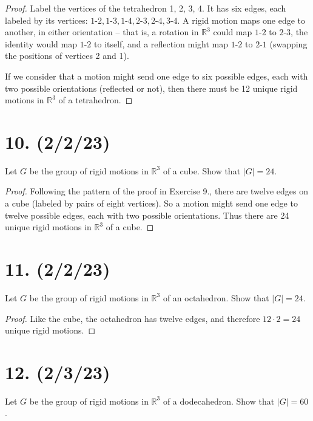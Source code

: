 \documentclass{article}
\begin{document}
\begin{proof}
    Label the vertices of the tetrahedron 1, 2, 3, 4. It has six edges, each labeled by its vertices: $1\textrm{-}2, 1\textrm{-}3, 1\textrm{-}4, 2\textrm{-}3, 2\textrm{-}4, 3\textrm{-}4$. A rigid motion maps one edge to another, in either orientation -- that is, a rotation in $\mathbb{R}^3$ could map $1\textrm{-}2$ to $2\textrm{-}3$, the identity would map $1\textrm{-}2$ to itself, and a reflection might map $1\textrm{-}2$ to $2\textrm{-}1$ (swapping the positions of vertices 2 and 1).

    If we consider that a motion might send one edge to six possible edges, each with two possible orientations (reflected or not), then there must be 12 unique rigid motions in $\mathbb{R}^3$ of a tetrahedron.
\end{proof}

\section*{10. (2/2/23)}

Let $G$ be the group of rigid motions in $\mathbb{R}^3$ of a cube. Show that $|G| = 24$.

\begin{proof}
    Following the pattern of the proof in Exercise 9., there are twelve edges on a cube (labeled by pairs of eight vertices). So a motion might send one edge to twelve possible edges, each with two possible orientations. Thus there are 24 unique rigid motions in $\mathbb{R}^3$ of a cube.
\end{proof}

\section*{11. (2/2/23)}

Let $G$ be the group of rigid motions in $\mathbb{R}^3$ of an octahedron. Show that $|G| = 24$.

\begin{proof}
    Like the cube, the octahedron has twelve edges, and therefore $12 \cdot 2 = 24$ unique rigid motions.
\end{proof}

\section*{12. (2/3/23)}

Let $G$ be the group of rigid motions in $\mathbb{R}^3$ of a dodecahedron. Show that $|G| = 60$.
\end{document}
